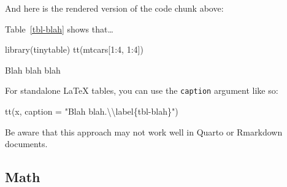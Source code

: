 \documentclass[
  letterpaper,
  DIV=11,
  numbers=noendperiod]{scrartcl}
\newenvironment{Shaded}{\begin{snugshade}}{\end{snugshade}}
\newcommand{\AttributeTok}[1]{\textcolor[rgb]{0.40,0.45,0.13}{#1}}
\newcommand{\DecValTok}[1]{\textcolor[rgb]{0.68,0.00,0.00}{#1}}
\newcommand{\FunctionTok}[1]{\textcolor[rgb]{0.28,0.35,0.67}{#1}}
\newcommand{\NormalTok}[1]{\textcolor[rgb]{0.00,0.23,0.31}{#1}}
\newcommand{\SpecialCharTok}[1]{\textcolor[rgb]{0.37,0.37,0.37}{#1}}
\newcommand{\StringTok}[1]{\textcolor[rgb]{0.13,0.47,0.30}{#1}}
\begin{document}
And here is the rendered version of the code chunk above:

Table~\ref{tbl-blah} shows that\ldots{}

\begin{Shaded}
\begin{Highlighting}[]
\FunctionTok{library}\NormalTok{(tinytable)}
\FunctionTok{tt}\NormalTok{(mtcars[}\DecValTok{1}\SpecialCharTok{:}\DecValTok{4}\NormalTok{, }\DecValTok{1}\SpecialCharTok{:}\DecValTok{4}\NormalTok{])}
\end{Highlighting}
\end{Shaded}

\begin{table}

\caption{\label{tbl-blah}Blah blah blah}


\end{table}%

For standalone LaTeX tables, you can use the \texttt{caption} argument
like so:

\begin{Shaded}
\begin{Highlighting}[]
\FunctionTok{tt}\NormalTok{(x, }\AttributeTok{caption =} \StringTok{"Blah blah.}\SpecialCharTok{\textbackslash{}\textbackslash{}}\StringTok{label\{tbl{-}blah\}"}\NormalTok{)}
\end{Highlighting}
\end{Shaded}

Be aware that this approach may not work well in Quarto or Rmarkdown
documents.

\subsection{Math}\label{math}
\end{document}
